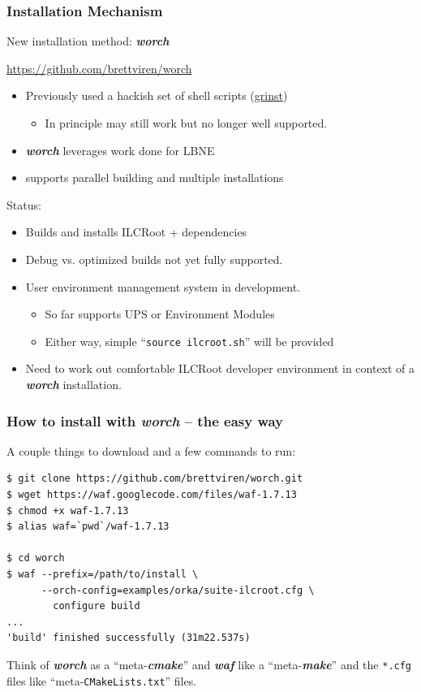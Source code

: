 \documentclass[xcolor=dvipsnames]{beamer}
\newcommand{\app}[1]{\textbf{\textit{#1}}\xspace}
\def\waf{\app{waf}}
\def\worch{\app{worch}}
\begin{document}
\begin{frame}
  \frametitle{Installation Mechanism}
  
  New installation method: \worch

  \begin{center}
    \url{https://github.com/brettviren/worch} 
  \end{center}

  \begin{itemize}
  \item Previously used a hackish set of shell scripts (\href{https://github.com/brettviren/grinst}{grinst})
    \begin{itemize}
    \item In principle may still work but no longer well supported.
    \end{itemize}
  \item \worch leverages work done for LBNE
  \item supports parallel building and multiple installations
  \end{itemize}

    Status:
    \begin{itemize}
    \item Builds and installs ILCRoot + dependencies
    \item Debug vs. optimized builds not yet fully supported.
    \item User environment management system in development.
      \begin{itemize}
      \item So far supports UPS or Environment Modules
      \item Either way, simple ``\texttt{source ilcroot.sh}'' will be provided
      \end{itemize}
    \item Need to work out comfortable ILCRoot developer environment
      in context of a \worch installation.
    \end{itemize}

\end{frame}

\begin{frame}[fragile]
  \frametitle{How to install with \worch{} -- the easy way}

A couple things to download and a few commands to run:

{\footnotesize
\begin{verbatim}
$ git clone https://github.com/brettviren/worch.git
$ wget https://waf.googlecode.com/files/waf-1.7.13
$ chmod +x waf-1.7.13
$ alias waf=`pwd`/waf-1.7.13

$ cd worch
$ waf --prefix=/path/to/install \
      --orch-config=examples/orka/suite-ilcroot.cfg \
        configure build
...
'build' finished successfully (31m22.537s)
\end{verbatim}
}

  Think of \worch as a ``meta-\app{cmake}'' and \waf like a
  ``meta-\app{make}'' and the \texttt{*.cfg} files like
  ``meta-\texttt{CMakeLists.txt}'' files.

\end{frame}
\end{document}
